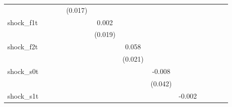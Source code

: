 {\begin{tabular}{l*{12}{c}}
            &                     &                     &                     &     (0.017)         &                     &                     &                     &                     &                     &                     &                     &                     \\
\addlinespace
shock\_f1t   &                     &                     &                     &                     &       0.002         &                     &                     &                     &                     &                     &                     &                     \\
            &                     &                     &                     &                     &     (0.019)         &                     &                     &                     &                     &                     &                     &                     \\
\addlinespace
shock\_f2t   &                     &                     &                     &                     &                     &       0.058\sym{***}&                     &                     &                     &                     &                     &                     \\
            &                     &                     &                     &                     &                     &     (0.021)         &                     &                     &                     &                     &                     &                     \\
\addlinespace
shock\_s0t   &                     &                     &                     &                     &                     &                     &      -0.008         &                     &                     &                     &                     &                     \\
            &                     &                     &                     &                     &                     &                     &     (0.042)         &                     &                     &                     &                     &                     \\
\addlinespace
shock\_s1t   &                     &                     &                     &                     &                     &                     &                     &      -0.002         &                     &                     &                     &                     \\

\end{tabular}}
